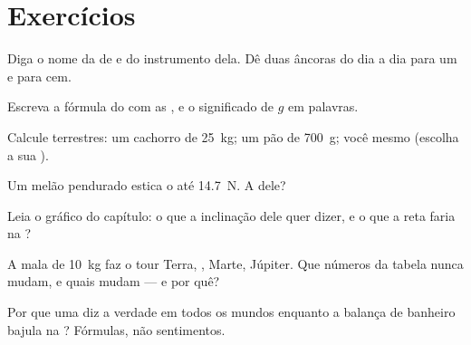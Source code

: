 \section{Exercícios}

\begin{exercise}[$\star$]\label{exo:g9:weight-vs-mass:1}
Diga o nome da  de  e do instrumento dela. Dê duas
âncoras do dia a dia para um  e para cem.
\end{exercise}

\begin{exercise}[$\star$]\label{exo:g9:weight-vs-mass:2}
Escreva a fórmula do  com as , e o significado de $g$ em
palavras.
\end{exercise}

\begin{exercise}[$\star$]\label{exo:g9:weight-vs-mass:3}
Calcule  terrestres: um cachorro de \qty{25}{kg}; um pão de
\qty{700}{g}; você mesmo (escolha a sua ).
\end{exercise}

\begin{exercise}[$\star$]\label{exo:g9:weight-vs-mass:4}
Um melão pendurado estica o  até \qty{14.7}{N}. A 
dele?
\end{exercise}

\begin{exercise}[$\star$]\label{exo:g9:weight-vs-mass:5}
Leia o gráfico do capítulo: o que a inclinação dele quer dizer, e o
que a reta faria na ?
\end{exercise}

\begin{exercise}[$\star$]\label{exo:g9:weight-vs-mass:6}
A mala de \qty{10}{kg} faz o tour Terra, , Marte, Júpiter. Que
números da tabela nunca mudam, e quais mudam --- e por quê?
\end{exercise}

\begin{exercise}[$\star$]\label{exo:g9:weight-vs-mass:7}
Por que uma  diz a verdade em todos os mundos
enquanto a balança de banheiro bajula na ? Fórmulas, não
sentimentos.
\end{exercise}

